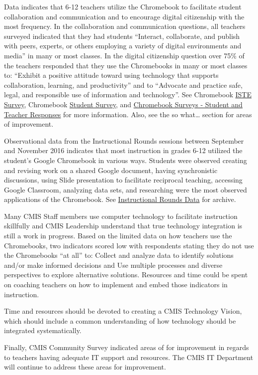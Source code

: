 \begin{findings}
Data indicates that 6-12 teachers utilize the Chromebook to facilitate student collaboration and communication and to encourage digital citizenship with the most frequency. In the collaboration and communication questions, all teachers surveyed  indicated that they had students “Interact, collaborate, and publish with peers, experts, or others employing a variety of digital environments and media” in many or most classes. In the digital citizenship question over 75\% of the teachers responded that they use the Chromebooks in many or most classes to: “Exhibit a positive attitude toward using technology that supports collaboration, learning, and productivity” and to “Advocate and practice safe, legal, and responsible use of information and technology”. See Chromebook \href{https://goo.gl/forms/QsbCBzfO0psqcbXQ2}{ISTE Survey}, Chromebook \href{https://goo.gl/forms/1mda4plq0tzQiTed2}{Student Survey}, and \href{https://docs.google.com/a/cmis.ac.th/presentation/d/1xmLAJD96klLrjiBPwCoOMoKmbclYqpIMWaifytzFMgk/edit?usp=sharing}{Chromebook Surveys - Student and Teacher Responses} for more information. Also, see the so what… section for areas of improvement.


Observational data from the Instructional Rounds sessions between September and November 2016 indicates that most instruction in grades 6-12 utilized the student’s Google Chromebook in various ways. Students were observed creating and revising work on a shared Google document, having synchronistic discussions,  using Slide presentation to facilitate reciprocal teaching, accessing Google Classroom, analyzing data sets, and researching were the most observed applications of the Chromebook. See \href{https://drive.google.com/drive/folders/0ByVFfrm0zfolUkxUSmg2VGJCTGc?usp=sharing}{Instructional Rounds Data} for archive.


Many CMIS Staff members use computer technology to facilitate instruction skillfully and CMIS Leadership understand that true technology integration is still a work in progress. Based on the limited data on how teachers use the Chromebooks, two indicators scored low with respondents stating they do not use the Chromebooks “at all”  to: Collect and analyze data to identify solutions and/or make informed decisions and Use multiple processes and diverse perspectives to explore alternative solutions. Resources and time could be spent on coaching teachers on how to implement and embed those indicators in instruction.

Time and resources should be devoted to creating a CMIS Technology Vision, which should include a common understanding of how technology should be integrated systematically. 

Finally, CMIS Community Survey indicated areas of for improvement in regards to teachers having adequate IT support and resources. The CMIS IT Department will continue to address these areas for improvement. 
\end{findings}

